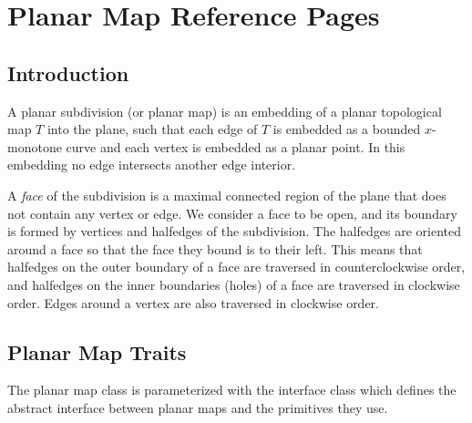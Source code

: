 


\clearpage
\section{Planar Map Reference Pages}

\subsection*{Introduction}

A planar subdivision (or planar map) is an embedding of a planar 
topological map $T$ 
into the plane, such that each edge of $T$ is embedded as a
bounded $x$-monotone curve and each vertex is embedded as a planar point.
In this embedding no
edge intersects another edge interior.

A {\em face} of the subdivision is a maximal connected region of the
plane that does not contain any vertex or edge. 
We consider a face to be open, and its boundary is
formed by vertices and halfedges of the subdivision.
The halfedges are oriented around a face so that the face they bound
is to their left. This means that halfedges on the outer boundary
of a face are traversed in counterclockwise order, and halfedges on the inner
boundaries (holes) of a face are traversed in clockwise order. Edges around a
vertex are also traversed in clockwise order. 

\subsection*{Planar Map Traits}
The planar map class is parameterized with the
interface class  which defines the abstract interface
between planar maps and the primitives they use. 

